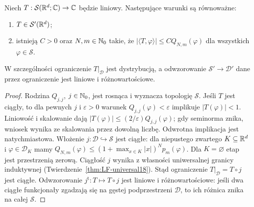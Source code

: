 \begin{twierdzenie}
\label{thm:tempered-estimate22}
Niech $T:\mathcal S(\mathbb R^d;\mathbb C)\to\mathbb C$ będzie liniowy.
Następujące warunki są równoważne:
\begin{enumerate}
\item $T\in\mathcal S'(\mathbb R^d)$;
\item istnieją $C>0$ oraz $N,m\in\mathbb N_0$ takie, że
$|\langle T,\varphi\rangle|\le C Q_{N,m}(\varphi)$
dla wszystkich $\varphi\in\mathcal S$.
\end{enumerate}
W szczególności ograniczenie $T|_{\mathcal D}$ jest dystrybucją,
a odwzorowanie $\mathcal S'\to\mathcal D'$ dane przez
ograniczenie jest liniowe i różnowartościowe.
\end{twierdzenie}
\begin{proof}
Rodzina $Q_{j,j}$, $j\in\mathbb N_0$, jest rosnąca
i wyznacza topologię $\mathcal S$. Jeśli $T$ jest ciągły,
to dla pewnych $j$ i $\varepsilon>0$ warunek
$Q_{j,j}(\varphi)<\varepsilon$ implikuje
$|T(\varphi)|<1$. Liniowość i skalowanie dają
$|T(\varphi)|\le (2/\varepsilon)Q_{j,j}(\varphi)$;
gdy seminorma znika, wniosek wynika ze skalowania przez
dowolną liczbę. Odwrotna implikacja jest natychmiastowa.
Włożenie $j:\mathcal D\hookrightarrow\mathcal S$ jest ciągłe:
dla niepustego zwartego $K\subseteq\mathbb R^d$ i
$\varphi\in\mathcal D_K$ mamy
$Q_{N,m}(\varphi)\le (1+\max_{x\in K}|x|)^N p_m(\varphi)$.
Dla $K=\varnothing$ etap jest przestrzenią zerową.
Ciągłość $j$ wynika z własności uniwersalnej granicy
induktywnej (Twierdzenie~\ref{thm:LF-universal18}).
Stąd ograniczenie $T|_{\mathcal D}=T\circ j$ jest ciągłe.
Odwzorowanie $j^{\mathrm t}:T\mapsto T\circ j$ jest
liniowe i różnowartościowe: jeśli dwa ciągłe funkcjonały
zgadzają się na gęstej podprzestrzeni $\mathcal D$,
to ich różnica znika na całej $\mathcal S$.
\end{proof}

